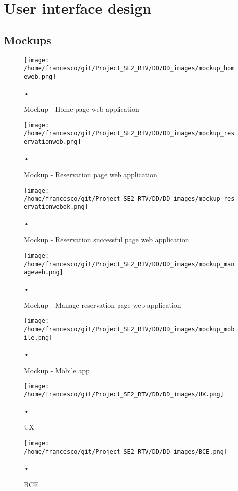 \documentclass[10pt, a4paper,titlepage]{article}
\begin{document}
\section{User interface design}
\subsection{Mockups}
\begin{figure}[h]
\begin{center}
\texttt{[image: /home/francesco/git/Project\_SE2\_RTV/DD/DD\_images/mockup\_homeweb.png]}
\caption{Mockup - Home page web application}
\label{fig:mockup_homeweb}
\end{center}•
\end{figure}
\begin{figure}[h]
\begin{center}
\texttt{[image: /home/francesco/git/Project\_SE2\_RTV/DD/DD\_images/mockup\_reservationweb.png]}
\caption{Mockup - Reservation page web application}
\label{fig:mockup_reservationweb}
\end{center}•
\end{figure}
\begin{figure}[h]
\begin{center}
\texttt{[image: /home/francesco/git/Project\_SE2\_RTV/DD/DD\_images/mockup\_reservationwebok.png]}
\caption{Mockup - Reservation successful page web application}
\label{fig:mockup_reservationwebok}
\end{center}•
\end{figure}
\begin{figure}[h]
\begin{center}
\texttt{[image: /home/francesco/git/Project\_SE2\_RTV/DD/DD\_images/mockup\_manageweb.png]}
\caption{Mockup - Manage reservation page web application}
\label{fig:mockup_manageweb}
\end{center}•
\end{figure}
\clearpage
\begin{figure}[h]
\begin{center}
\texttt{[image: /home/francesco/git/Project\_SE2\_RTV/DD/DD\_images/mockup\_mobile.png]}
\caption{Mockup - Mobile app}
\label{fig:mockup_mobile}
\end{center}•
\end{figure}
\begin{figure}[h]
\begin{center}
\texttt{[image: /home/francesco/git/Project\_SE2\_RTV/DD/DD\_images/UX.png]}
\caption{UX}
\label{fig:UX}
\end{center}•
\end{figure}
\begin{figure}[h]
\begin{center}
\texttt{[image: /home/francesco/git/Project\_SE2\_RTV/DD/DD\_images/BCE.png]}
\caption{BCE}
\label{fig:BCE}
\end{center}•
\end{figure}
\clearpage
\end{document}
